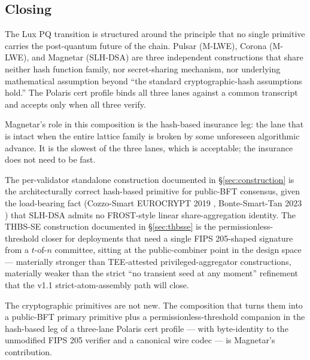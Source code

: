 \subsection{Closing}
\label{sec:conclusion:closing}

The Lux PQ transition is structured around the principle that no
single primitive carries the post-quantum future of the chain.
Pulsar (M-LWE), Corona (M-LWE), and Magnetar (SLH-DSA) are three
independent constructions that share neither hash function family,
nor secret-sharing mechanism, nor underlying mathematical
assumption beyond ``the standard cryptographic-hash assumptions
hold.'' The Polaris cert profile binds all three lanes against a
common transcript and accepts only when all three verify.

Magnetar's role in this composition is the hash-based insurance
leg: the lane that is intact when the entire lattice family is
broken by some unforeseen algorithmic advance. It is the slowest
of the three lanes, which is acceptable; the insurance does not
need to be fast.

The per-validator standalone construction documented in
\S\ref{sec:construction} is the architecturally correct hash-based
primitive for public-BFT consensus, given the load-bearing fact
(Cozzo-Smart EUROCRYPT 2019 \cite{cosmin2021},
Bonte-Smart-Tan 2023 \cite{bonte2023threshold}) that SLH-DSA admits
no FROST-style linear share-aggregation identity. The THBS-SE
construction documented in \S\ref{sec:thbsse} is the
permissionless-threshold closer for deployments that need a single
FIPS 205-shaped signature from a $t$-of-$n$ committee, sitting at
the public-combiner point in the design space --- materially
stronger than TEE-attested privileged-aggregator constructions,
materially weaker than the strict ``no transient seed at any
moment'' refinement that the v1.1 strict-atom-assembly path will
close.

The cryptographic primitives are not new. The composition that
turns them into a public-BFT primary primitive plus a
permissionless-threshold companion in the hash-based leg of a
three-lane Polaris cert profile --- with byte-identity to the
unmodified FIPS 205 verifier and a canonical wire codec --- is
Magnetar's contribution.
